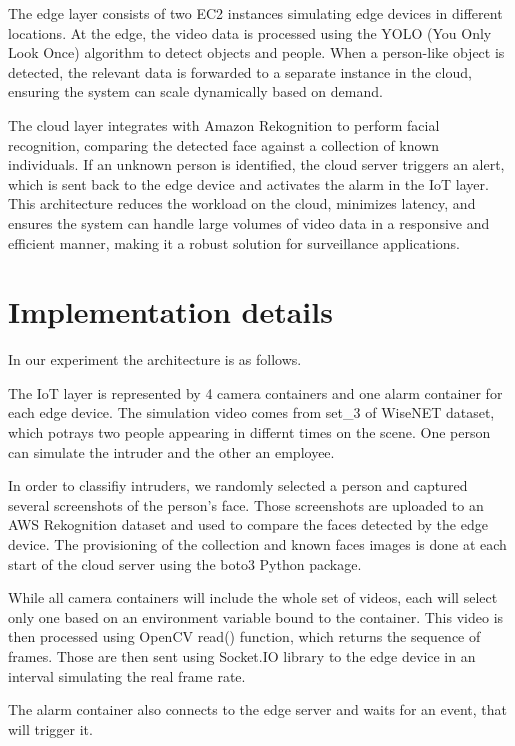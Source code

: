 \documentclass[conference]{IEEEtran}
\begin{document}
The edge layer consists of two EC2 instances simulating edge devices in different locations. At the edge, the video data is processed using the YOLO (You Only Look Once) algorithm to detect objects and people. When a person-like object is detected, the relevant data is forwarded to a separate instance in the cloud, ensuring the system can scale dynamically based on demand.

The cloud layer integrates with Amazon Rekognition to perform facial recognition, comparing the detected face against a collection of known individuals. If an unknown person is identified, the cloud server triggers an alert, which is sent back to the edge device and activates the alarm in the IoT layer. This architecture reduces the workload on the cloud, minimizes latency, and ensures the system can handle large volumes of video data in a responsive and efficient manner, making it a robust solution for surveillance applications.



\section{Implementation details}
In our experiment the architecture is as follows.

The IoT layer is represented by 4 camera containers and one alarm container for each edge device. The simulation video comes from set\_3 of WiseNET dataset, which potrays two people appearing in differnt times on the scene. One person can simulate the intruder and the other an employee. 

In order to classifiy intruders, we randomly selected a person and captured several screenshots of the person's face. Those screenshots are uploaded to an AWS Rekognition dataset and used to compare the faces detected by the edge device. The provisioning of the collection and known faces images is done at each start of the cloud server using the boto3 Python package.


While all camera containers will include the whole set of videos, each will select only one based on an environment variable bound to the container. This video is then processed using OpenCV read() function, which returns the sequence of frames. Those are then sent using Socket.IO library to the edge device in an interval simulating the real frame rate. 

The alarm container also connects to the edge server and waits for an event, that will trigger it.
\end{document}
